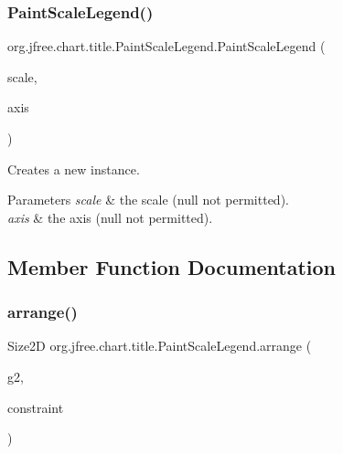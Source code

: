 \subsubsection{\texorpdfstring{Paint\+Scale\+Legend()}{PaintScaleLegend()}}
{\footnotesize\ttfamily org.\+jfree.\+chart.\+title.\+Paint\+Scale\+Legend.\+Paint\+Scale\+Legend (\begin{DoxyParamCaption}\item[{\mbox{\hyperlink{interfaceorg_1_1jfree_1_1chart_1_1renderer_1_1_paint_scale}{Paint\+Scale}}}]{scale,  }\item[{\mbox{\hyperlink{classorg_1_1jfree_1_1chart_1_1axis_1_1_value_axis}{Value\+Axis}}}]{axis }\end{DoxyParamCaption})}

Creates a new instance.


\begin{DoxyParams}{Parameters}
{\em scale} & the scale ({\ttfamily null} not permitted). \\
\hline
{\em axis} & the axis ({\ttfamily null} not permitted). \\
\hline
\end{DoxyParams}


\subsection{Member Function Documentation}
\mbox{\label{classorg_1_1jfree_1_1chart_1_1title_1_1_paint_scale_legend_a893860f6362afa2f5e22dd1b0ff301f7}} 
\subsubsection{\texorpdfstring{arrange()}{arrange()}}
{\footnotesize\ttfamily Size2D org.\+jfree.\+chart.\+title.\+Paint\+Scale\+Legend.\+arrange (\begin{DoxyParamCaption}\item[{Graphics2D}]{g2,  }\item[{\mbox{\hyperlink{classorg_1_1jfree_1_1chart_1_1block_1_1_rectangle_constraint}{Rectangle\+Constraint}}}]{constraint }\end{DoxyParamCaption})}

